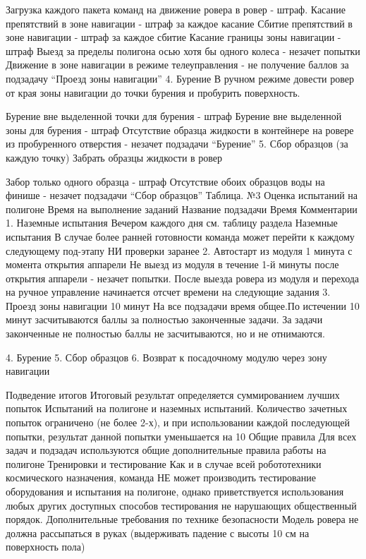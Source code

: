 \begin{table}
\begin{longtable}
Загрузка каждого пакета команд на движение ровера в ровер - штраф.
Касание препятствий в зоне навигации - штраф за каждое касание
Сбитие препятствий в зоне навигации - штраф за каждое сбитие
Касание границы зоны навигации - штраф
Выезд за пределы полигона осью хотя бы одного колеса - незачет попытки
Движение в зоне навигации в режиме телеуправления - не получение баллов за подзадачу “Проезд зоны навигации”
4.	Бурение
	В ручном режиме довести ровер от края зоны навигации до точки бурения и пробурить поверхность. 

Бурение вне выделенной точки для бурения - штраф 
Бурение вне выделенной зоны для бурения - штраф
Отсутствие образца жидкости в контейнере на ровере из пробуренного отверстия - незачет подзадачи “Бурение”
5.	Сбор образцов
(за каждую точку)	Забрать образцы жидкости в ровер

Забор только одного образца - штраф
Отсутствие обоих образцов воды на финише - незачет подзадачи “Сбор образцов”
Таблица. №3 Оценка испытаний на полигоне
Время на выполнение заданий
 	Название подзадачи	Время	Комментарии
1.	Наземные испытания	Вечером каждого дня см. таблицу раздела Наземные испытания	В случае более ранней готовности команда может перейти к каждому следующему под-этапу НИ проверки заранее
2.	Автостарт из модуля	1 минута с момента открытия аппарели	Не выезд из модуля в течение 1-й минуты после открытия аппарели - незачет попытки. После выезда ровера из модуля и перехода на ручное управление начинается отсчет времени на следующие задания
3.	Проезд зоны навигации
	10 минут	На все подзадачи время общее.По истечении 10 минут засчитываются баллы за полностью законченные задачи. За задачи законченные не полностью баллы не засчитываются, но и не отнимаются.  

4.	Бурение		
5.	Сбор образцов		
6.	Возврат к посадочному модулю через зону навигации		

Подведение итогов
Итоговый результат определяется суммированием лучших попыток Испытаний на полигоне и наземных испытаний. Количество зачетных попыток ограничено (не более 2-х), и при использовании каждой последующей попытки, результат данной попытки уменьшается на 10%
Общие правила
Для всех задач и подзадач используются общие дополнительные правила работы на полигоне
Тренировки и тестирование
Как и в случае всей робототехники космического назначения, команда НЕ может производить тестирование оборудования и испытания на полигоне, однако приветствуется использования любых других доступных способов тестирования не нарушающих общественный порядок.
Дополнительные требования по технике безопасности 
Модель ровера  не должна рассыпаться в руках (выдерживать падение с высоты 10 см на поверхность пола)


\end{longtable}
\end{table}
